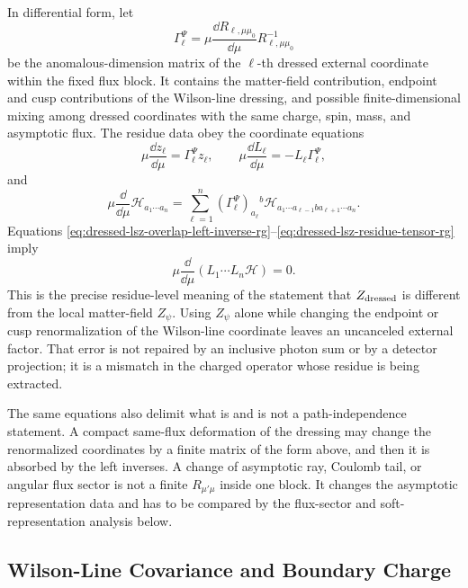 In differential form, let
\[
  \Gamma_{\ell}^{\Psi}
  =
  \mu\frac{\dd R_{\ell,\mu\mu_0}}{\dd\mu}R_{\ell,\mu\mu_0}^{-1}
\]
be the anomalous-dimension matrix of the \(\ell\)-th dressed external
coordinate within the fixed flux block.  It contains the matter-field
contribution, endpoint and cusp contributions of the Wilson-line dressing,
and possible finite-dimensional mixing among dressed coordinates with the
same charge, spin, mass, and asymptotic flux.  The residue data obey the
coordinate equations
\begin{equation}
  \mu\frac{\dd z_\ell}{\dd\mu}=\Gamma_\ell^\Psi z_\ell,
  \qquad
  \mu\frac{\dd L_\ell}{\dd\mu}=-L_\ell\Gamma_\ell^\Psi,
  \label{eq:dressed-lsz-overlap-left-inverse-rg}
\end{equation}
and
\begin{equation}
  \mu\frac{\dd}{\dd\mu}
  \mathcal H_{a_1\cdots a_n}
  =
  \sum_{\ell=1}^{n}
  (\Gamma_\ell^\Psi)_{a_\ell}{}^{b}
  \mathcal H_{a_1\cdots a_{\ell-1}b a_{\ell+1}\cdots a_n}.
  \label{eq:dressed-lsz-residue-tensor-rg}
\end{equation}
Equations
\eqref{eq:dressed-lsz-overlap-left-inverse-rg}--\eqref{eq:dressed-lsz-residue-tensor-rg}
imply
\[
  \mu\frac{\dd}{\dd\mu}
  \left(
    L_1\cdots L_n\mathcal H
  \right)
  =0 .
\]
This is the precise residue-level meaning of the statement that
\(Z_{\rm dressed}\) is different from the local matter-field \(Z_\psi\).
Using \(Z_\psi\) alone while changing the endpoint or cusp renormalization of
the Wilson-line coordinate leaves an uncanceled external factor.  That error
is not repaired by an inclusive photon sum or by a detector projection; it is
a mismatch in the charged operator whose residue is being extracted.

The same equations also delimit what is and is not a path-independence
statement.  A compact same-flux deformation of the dressing may change the
renormalized coordinates by a finite matrix of the form above, and then it is
absorbed by the left inverses.  A change of asymptotic ray, Coulomb tail, or
angular flux sector is not a finite \(R_{\mu'\mu}\) inside one block.  It
changes the asymptotic representation data and has to be compared by the
flux-sector and soft-representation analysis below.

\subsection{Wilson-Line Covariance and Boundary Charge}

